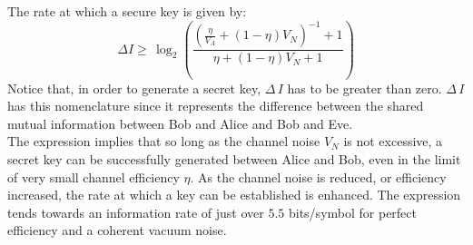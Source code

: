 \begin{refsection}
The rate at which a secure key is given by:
\begin{equation}
\Delta I \geq \,\log_2\left(\frac{\left(\frac{\eta}{V_A}+\left(1-\eta\right)V_N\right)^{-1}+1}{\eta+\left(1-\eta\right)V_N+1}\right)
\end{equation}
Notice that, in order to generate a secret key, $\Delta \,I$ has to be greater than zero. $\Delta\,I$ has this nomenclature since it  represents the difference between the shared mutual information between Bob and Alice and Bob and Eve.\\
The expression implies that so long as the channel noise $V_N$ is not excessive, a secret key can be successfully generated between Alice and Bob, even in the limit of very small channel efficiency $\eta$. As the channel noise is reduced, or
efficiency increased, the rate at which a key can be established is enhanced. The expression tends towards an information rate of just over $5.5$ bits/symbol for perfect efficiency and a coherent vacuum noise.

\clearpage
\printbibliography[heading=subbibliography]
\end{refsection}
\cleardoublepage
